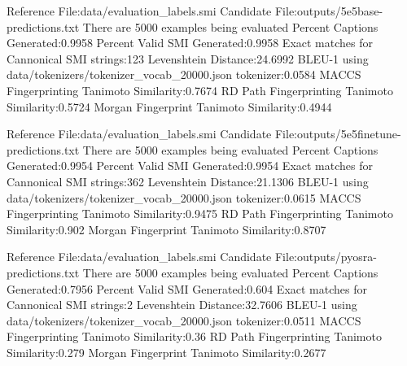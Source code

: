 Reference File:data/evaluation_labels.smi
Candidate File:outputs/5e5base-predictions.txt
There are 5000 examples being evaluated
Percent Captions Generated:0.9958
Percent Valid SMI Generated:0.9958
Exact matches for Cannonical SMI strings:123
Levenshtein Distance:24.6992
BLEU-1 using data/tokenizers/tokenizer_vocab_20000.json tokenizer:0.0584
MACCS Fingerprinting Tanimoto Similarity:0.7674
RD Path Fingerprinting Tanimoto Similarity:0.5724
Morgan Fingerprint Tanimoto Similarity:0.4944


Reference File:data/evaluation_labels.smi
Candidate File:outputs/5e5finetune-predictions.txt
There are 5000 examples being evaluated
Percent Captions Generated:0.9954
Percent Valid SMI Generated:0.9954
Exact matches for Cannonical SMI strings:362
Levenshtein Distance:21.1306
BLEU-1 using data/tokenizers/tokenizer_vocab_20000.json tokenizer:0.0615
MACCS Fingerprinting Tanimoto Similarity:0.9475
RD Path Fingerprinting Tanimoto Similarity:0.902
Morgan Fingerprint Tanimoto Similarity:0.8707

Reference File:data/evaluation_labels.smi
Candidate File:outputs/pyosra-predictions.txt
There are 5000 examples being evaluated
Percent Captions Generated:0.7956
Percent Valid SMI Generated:0.604
Exact matches for Cannonical SMI strings:2
Levenshtein Distance:32.7606
BLEU-1 using data/tokenizers/tokenizer_vocab_20000.json tokenizer:0.0511
MACCS Fingerprinting Tanimoto Similarity:0.36
RD Path Fingerprinting Tanimoto Similarity:0.279
Morgan Fingerprint Tanimoto Similarity:0.2677
